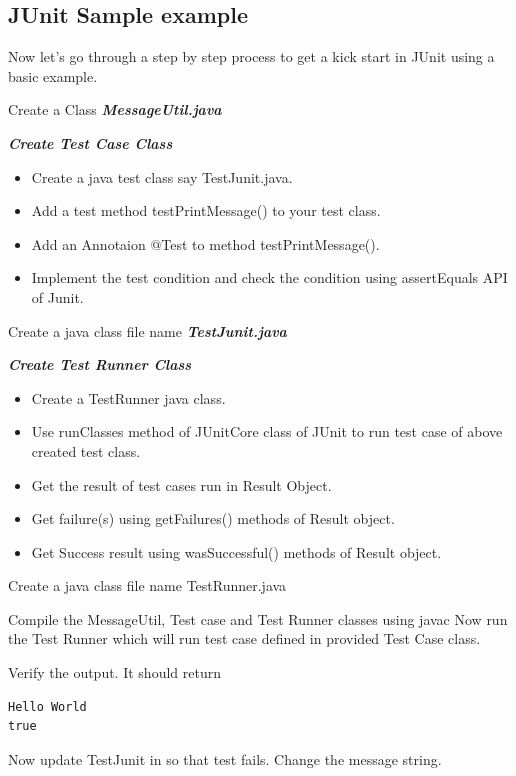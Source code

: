 \documentclass[11pt,a4paper]{article}
\begin{document}
\subsection*{JUnit Sample example}
Now let's go through a step by step process to get a kick start in JUnit using a basic example.

Create a Class \emph{\textbf{MessageUtil.java}}



\emph{\textbf{Create Test Case Class}}
\begin{itemize}
\item Create a java test class say TestJunit.java.
\item Add a test method testPrintMessage() to your test class.
\item Add an Annotaion @Test to method testPrintMessage().
\item Implement the test condition and check the condition using assertEquals API of Junit.
\end{itemize}

\break
Create a java class file name \emph{\textbf{TestJunit.java}}



\emph{\textbf{Create Test Runner Class}}

\begin{itemize}
\item Create a TestRunner java class.
\item Use runClasses method of JUnitCore class of JUnit to run test case of above created test class.
\item Get the result of test cases run in Result Object.
\item Get failure(s) using getFailures() methods of Result object.
\item Get Success result using wasSuccessful() methods of Result object.
\end{itemize}
Create a java class file name TestRunner.java



Compile the MessageUtil, Test case and Test Runner classes using javac
Now run the Test Runner which will run test case defined in provided Test Case class.

Verify the output.
It should return

\begin{lstlisting}[numbers=none]
Hello World
true
\end{lstlisting}
Now update TestJunit in so that test fails. Change the message string.

\end{document}
